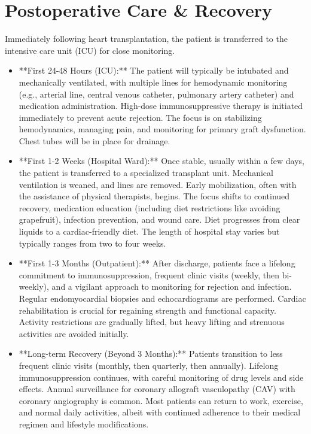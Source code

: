 \section*{Postoperative Care \& Recovery}
Immediately following heart transplantation, the patient is transferred to the intensive care unit (ICU) for close monitoring.

\begin{itemize}
  \item **First 24-48 Hours (ICU):** The patient will typically be intubated and mechanically ventilated, with multiple lines for hemodynamic monitoring (e.g., arterial line, central venous catheter, pulmonary artery catheter) and medication administration. High-dose immunosuppressive therapy is initiated immediately to prevent acute rejection. The focus is on stabilizing hemodynamics, managing pain, and monitoring for primary graft dysfunction. Chest tubes will be in place for drainage.
  
  \item **First 1-2 Weeks (Hospital Ward):** Once stable, usually within a few days, the patient is transferred to a specialized transplant unit. Mechanical ventilation is weaned, and lines are removed. Early mobilization, often with the assistance of physical therapists, begins. The focus shifts to continued recovery, medication education (including diet restrictions like avoiding grapefruit), infection prevention, and wound care. Diet progresses from clear liquids to a cardiac-friendly diet. The length of hospital stay varies but typically ranges from two to four weeks.
  
  \item **First 1-3 Months (Outpatient):** After discharge, patients face a lifelong commitment to immunosuppression, frequent clinic visits (weekly, then bi-weekly), and a vigilant approach to monitoring for rejection and infection. Regular endomyocardial biopsies and echocardiograms are performed. Cardiac rehabilitation is crucial for regaining strength and functional capacity. Activity restrictions are gradually lifted, but heavy lifting and strenuous activities are avoided initially.
  
  \item **Long-term Recovery (Beyond 3 Months):** Patients transition to less frequent clinic visits (monthly, then quarterly, then annually). Lifelong immunosuppression continues, with careful monitoring of drug levels and side effects. Annual surveillance for coronary allograft vasculopathy (CAV) with coronary angiography is common. Most patients can return to work, exercise, and normal daily activities, albeit with continued adherence to their medical regimen and lifestyle modifications.
\end{itemize}

